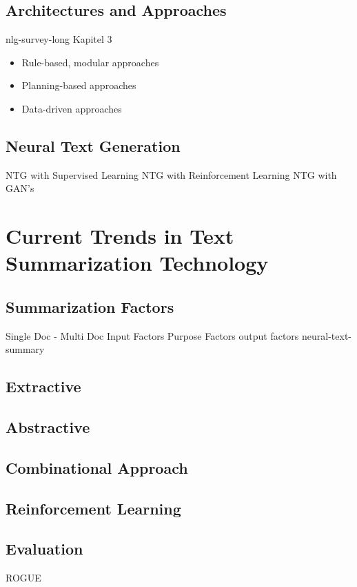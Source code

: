 \subsection{Architectures and Approaches}

nlg-survey-long Kapitel 3

\begin{itemize}
	\item Rule-based, modular approaches
	\item Planning-based approaches
	\item Data-driven approaches
\end{itemize}


\subsection{Neural Text Generation}
NTG with Supervised Learning
NTG with Reinforcement Learning
NTG with GAN's

\section{Current Trends in Text Summarization Technology}\label{ss:trends}

\subsection{Summarization Factors}
Single Doc - Multi Doc
Input Factors
Purpose Factors
output factors
neural-text-summary

\subsection{Extractive}
\subsection{Abstractive}
\subsection{Combinational Approach}
\subsection{Reinforcement Learning}
\subsection{Evaluation}
ROGUE